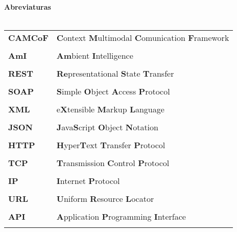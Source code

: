 \documentclass[a4paper, 12pt, oneside]{Thesis}  %
\begin{document}
\renewcommand\listtablename{Lista de tabelas}


\clearpage  %

{\centering \LARGE
{\LARGE\bf \textbf{Abreviaturas} } }\\\\


\begin{table}[!h]
\begin{tabular}{ll} 
	\textbf{CAMCoF}	& \textbf{C}ontext \textbf{M}ultimodal  \textbf{C}omunication \textbf{F}ramework	 \\ \\
	\textbf{AmI}	& \textbf{Am}bient \textbf{I}ntelligence	 \\ \\
	\textbf{REST}	& \textbf{Re}presentational \textbf{S}tate \textbf{T}ransfer	 \\ \\
	\textbf{SOAP}	& \textbf{S}imple \textbf{O}bject  \textbf{A}ccess \textbf{P}rotocol	 \\ \\
	\textbf{XML}	& e\textbf{X}tensible \textbf{M}arkup  \textbf{L}anguage	 \\ \\
	\textbf{JSON}	& \textbf{J}ava\textbf{S}cript  \textbf{O}bject \textbf{N}otation	 \\ \\
	\textbf{HTTP}	& \textbf{H}yper\textbf{T}ext  \textbf{T}ransfer \textbf{P}rotocol	 \\ \\
	\textbf{TCP}	& \textbf{T}ransmission \textbf{C}ontrol  \textbf{P}rotocol	 \\ \\
	\textbf{IP}	& \textbf{I}nternet \textbf{P}rotocol	 \\ \\
	\textbf{URL}	& \textbf{U}niform \textbf{R}esource  \textbf{L}ocator	 \\ \\
	\textbf{API}	& \textbf{A}pplication \textbf{P}rogramming  \textbf{I}nterface  \\ \\

\end{tabular}
\end{table}
\end{document}
